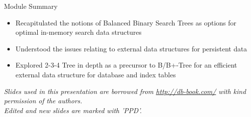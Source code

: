 \documentclass[aspectratio=169, xcolor=dvipsnames]{beamer}
\begin{document}
\begin{frame}{Module Summary}
    \begin{block}{}
        \begin{itemize}[<+->]
            \item Recapitulated the notions of Balanced Binary Search Trees as options for optimal in-memory search data structures
            \item Understood the issues relating to external data structures for persistent data
            \item Explored 2-3-4 Tree in depth as a precursor to B/B+-Tree for an efficient external data structure for database and index tables
        \end{itemize}
    \end{block}
    \vspace{2em}
    \begin{center}
    \small \textit{Slides used in this presentation are borrowed from \url{http://db-book.com/} with kind permission of the authors.} \\
    \small \textit{Edited and new slides are marked with 'PPD'.}
    \end{center}
\end{frame}
\end{document}
